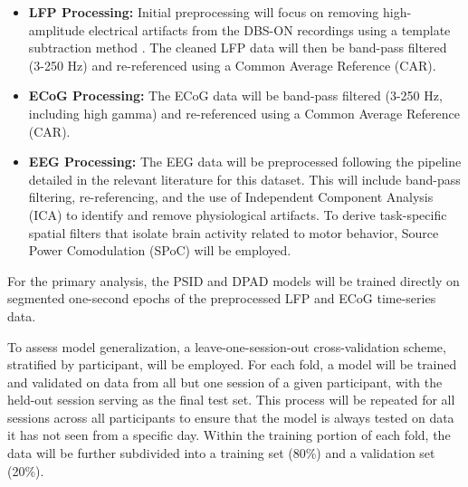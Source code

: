 \documentclass[12pt, a4paper]{article}
\begin{document}
\begin{itemize}
    \item \textbf{LFP Processing:} Initial preprocessing will focus on removing high-amplitude electrical artifacts from the DBS-ON recordings using a template subtraction method \parencite{qianMethodRemovalDeep2017,hammerArtifactCharacterizationMultipurpose2022}. The cleaned LFP data will then be band-pass filtered (3-250 Hz) and re-referenced using a Common Average Reference (CAR).

    \item \textbf{ECoG Processing:} The ECoG data will be band-pass filtered (3-250 Hz, including high gamma) and re-referenced using a Common Average Reference (CAR).

    \item \textbf{EEG Processing:} The EEG data will be preprocessed following the pipeline detailed in the relevant literature for this dataset. This will include band-pass filtering, re-referencing, and the use of Independent Component Analysis (ICA) to identify and remove physiological artifacts. To derive task-specific spatial filters that isolate brain activity related to motor behavior, Source Power Comodulation (SPoC) will be employed.
\end{itemize}

For the primary analysis, the PSID and DPAD models will be trained directly on segmented one-second epochs of the preprocessed LFP and ECoG time-series data.

To assess model generalization, a leave-one-session-out cross-validation scheme, stratified by participant, will be employed. For each fold, a model will be trained and validated on data from all but one session of a given participant, with the held-out session serving as the final test set. This process will be repeated for all sessions across all participants to ensure that the model is always tested on data it has not seen from a specific day. Within the training portion of each fold, the data will be further subdivided into a training set (80\%) and a validation set (20\%).
\end{document}

